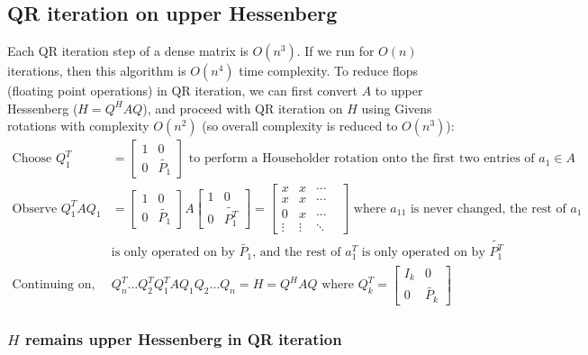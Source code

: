 \documentclass{article}
\begin{document}
\subsection{QR iteration on upper Hessenberg}
Each QR iteration step of a dense matrix is $O(n^3)$. If we run for $O(n)$ iterations, then this algorithm is $O(n^4)$ time complexity. To reduce flops (floating point operations) in QR iteration, we can first convert $A$ to upper Hessenberg ($H = Q^HAQ$), and proceed with QR iteration on $H$ using Givens rotations with complexity $O(n^2)$ (so overall complexity is reduced to $O(n^3)$):
\begin{align*}
    \textrm{Choose } Q_1^T &= \begin{bmatrix} 1 & 0 \\ 0 & \tilde{P_1} \end{bmatrix} \textrm{ to perform a Householder rotation onto the first two entries of } a_1 \in A\\
    \textrm{Observe }Q_1^T A Q_1 &= \begin{bmatrix} 1 & 0 \\ 0 & \tilde{P_1} \end{bmatrix} A \begin{bmatrix} 1 & 0 \\ 0 & \tilde{P_1^T} \end{bmatrix} = \begin{bmatrix} x & x & \cdots & \\
        x & x & \cdots \\ 0 & x &\cdots \\ \vdots & \vdots & \ddots \end{bmatrix} \textrm{ where $a_{11}$ is never changed, the rest of $a_1$}\\
        &\textrm{is only operated on by $\tilde{P_1}$, and the rest of $a_1^T$ is only operated on by $\tilde{P_1^T}$}\\
    \textrm{Continuing on, } & Q_n^T \dots Q_2^TQ_1^T A Q_1Q_2 \dots Q_n = H = Q^HAQ \textrm{ where } Q_k^T = \begin{bmatrix} I_k & 0 \\ 0 & \tilde{P_k} \end{bmatrix}
\end{align*}

\subsubsection{$H$ remains upper Hessenberg in QR iteration}
\end{document}
